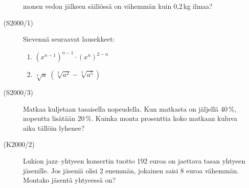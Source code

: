 \begin{description}
                       monen vedon jälkeen säiliössä on vähemmän kuin 0,2\,kg ilmaa?
    \item[(S2000/1)]   Sievennä seuraavat lausekkeet:
        \begin{enumerate}
            \item $ \left( x^{n - 1} \right)^{n - 1} \cdot  \left( x^{n} \right)^{2 - n} $
            \item $ \sqrt[3]{a} \; ( \sqrt[3]{a^2} - \sqrt[3]{a^5}) $
        \end{enumerate}
    \item[(S2000/3)]   Matkaa kuljetaan tasaisella nopeudella. Kun matkasta on jäljellä 40\,\%, nopeutta lisätään 20\,\%.
                       Kuinka monta prosenttia koko matkaan kuluva aika tällöin lyhenee?
    \item[(K2000/2)]   Lukion jazz--yhtyeen konsertin tuotto 192 euroa on jaettava tasan yhtyeen jäsenille. Jos jäseniä olisi 2
                       enemmän, jokainen saisi 8 euroa vähemmän. Montako jäsentä yhtyeessä on?

\end{description}
